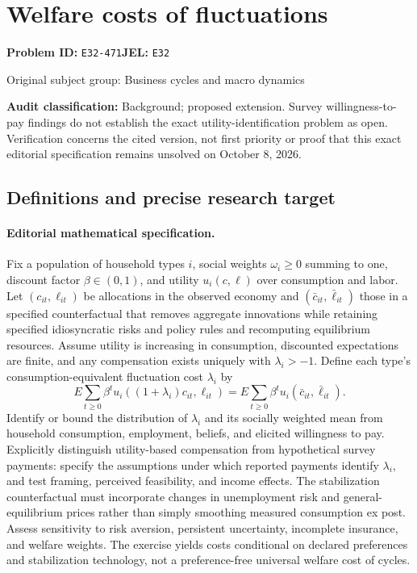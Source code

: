 \documentclass[11pt,a4paper]{article}
\begin{document}
\section*{Welfare costs of fluctuations}
\textbf{Problem ID:} \texttt{E32-471}\quad \textbf{JEL:} \texttt{E32}\par
\label{problem:OP-0237}
{\sffamily\small\color{muted}Original subject group: Business cycles and macro dynamics\par}
\label{definitions:problem:30007518}
\textbf{Audit classification:} Background; proposed extension. Survey willingness-to-pay findings do not establish the exact utility-identification problem as open. Verification concerns the cited version, not first priority or proof that this exact editorial specification remains unsolved on October 8, 2026.
\subsection*{Definitions and precise research target}
\paragraph{Editorial mathematical specification.} Fix a population of household types \(i\), social weights \(\omega_i\ge0\) summing to one, discount factor \(\beta\in(0,1)\), and utility \(u_i(c,\ell)\) over consumption and labor. Let \((c_{it},\ell_{it})\) be allocations in the observed economy and \((\bar c_{it},\bar\ell_{it})\) those in a specified counterfactual that removes aggregate innovations while retaining specified idiosyncratic risks and policy rules and recomputing equilibrium resources. Assume utility is increasing in consumption, discounted expectations are finite, and any compensation exists uniquely with \(\lambda_i>-1\). Define each type’s consumption-equivalent fluctuation cost \(\lambda_i\) by
\[
E\sum_{t\ge0}\beta^t u_i((1+\lambda_i)c_{it},\ell_{it})
=E\sum_{t\ge0}\beta^t u_i(\bar c_{it},\bar\ell_{it}).
\]
Identify or bound the distribution of \(\lambda_i\) and its socially weighted mean from household consumption, employment, beliefs, and elicited willingness to pay. Explicitly distinguish utility-based compensation from hypothetical survey payments: specify the assumptions under which reported payments identify \(\lambda_i\), and test framing, perceived feasibility, and income effects. The stabilization counterfactual must incorporate changes in unemployment risk and general-equilibrium prices rather than simply smoothing measured consumption ex post. Assess sensitivity to risk aversion, persistent uncertainty, incomplete insurance, and welfare weights. The exercise yields costs conditional on declared preferences and stabilization technology, not a preference-free universal welfare cost of cycles.
\end{document}
